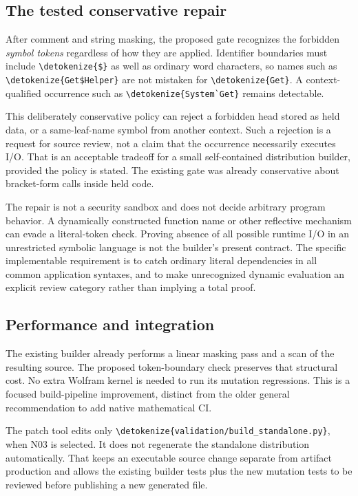 \documentclass[11pt,a4paper]{article}
\newcommand{\wl}[1]{\texttt{\expandafter\nolinkurl\expandafter{\detokenize{#1}}}}
\begin{document}
\subsection{The tested conservative repair}

After comment and string masking, the proposed gate recognizes the forbidden
\emph{symbol tokens} regardless of how they are applied. Identifier boundaries
must include \wl{$} as well as ordinary word characters, so names such as
\wl{Get$Helper} are not mistaken for \wl{Get}. A context-qualified occurrence
such as \wl{System`Get} remains detectable.

This deliberately conservative policy can reject a forbidden head stored as
held data, or a same-leaf-name symbol from another context. Such a rejection is
a request for source review, not a claim that the occurrence necessarily executes
I/O. That is an acceptable tradeoff for a small self-contained distribution
builder, provided the policy is stated. The existing gate was already
conservative about bracket-form calls inside held code.\cite{builder}

The repair is not a security sandbox and does not decide arbitrary program
behavior. A dynamically constructed function name or other reflective mechanism
can evade a literal-token check. Proving absence of all possible runtime I/O in
an unrestricted symbolic language is not the builder's present contract. The
specific implementable requirement is to catch ordinary literal dependencies in
all common application syntaxes, and to make unrecognized dynamic evaluation an
explicit review category rather than implying a total proof.

\subsection{Performance and integration}

The existing builder already performs a linear masking pass and a scan of the
resulting source. The proposed token-boundary check preserves that structural
cost. No extra Wolfram kernel is needed to run its mutation regressions. This
is a focused build-pipeline improvement, distinct from the older general
recommendation to add native mathematical CI.\cite{builder,workflow,status}

The patch tool edits only \wl{validation/build_standalone.py}, when N03 is
selected. It does not regenerate the standalone distribution automatically.
That keeps an executable source change separate from artifact production and
allows the existing builder tests plus the new mutation tests to be reviewed
before publishing a new generated file.
\end{document}

